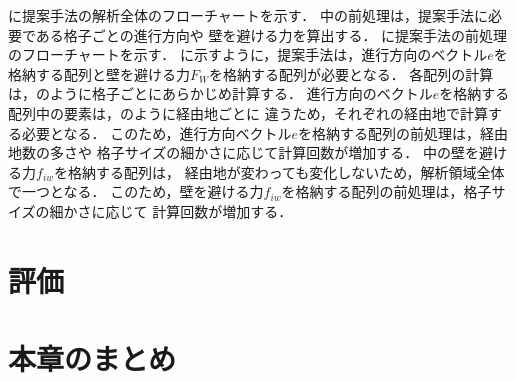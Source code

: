に提案手法の解析全体のフローチャートを示す．
中の前処理は，提案手法に必要である格子ごとの進行方向や
壁を避ける力を算出する．
に提案手法の前処理のフローチャートを示す．
に示すように，提案手法は，進行方向のベクトル$e$を
格納する配列と壁を避ける力$F_W$を格納する配列が必要となる．
各配列の計算は，のように格子ごとにあらかじめ計算する．
進行方向のベクトル$e$を格納する配列中の要素は，のように経由地ごとに
違うため，それぞれの経由地で計算する必要となる．
このため，進行方向ベクトル$e$を格納する配列の前処理は，経由地数の多さや
格子サイズの細かさに応じて計算回数が増加する．
中の壁を避ける力$f_{iw}$を格納する配列は，
経由地が変わっても変化しないため，解析領域全体で一つとなる．
このため，壁を避ける力$f_{iw}$を格納する配列の前処理は，格子サイズの細かさに応じて
計算回数が増加する．


\section{評価}

\section{本章のまとめ}

